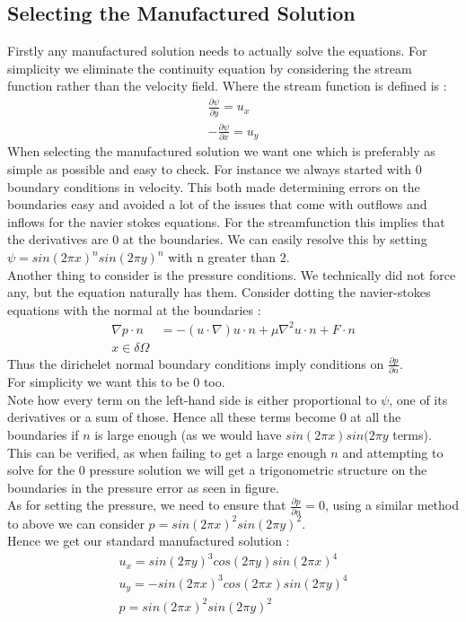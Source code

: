 \documentclass[11pt,twoside,a4paper]{article}
\begin{document}
\subsection{Selecting the Manufactured Solution}
Firstly any manufactured solution needs to actually solve the equations. For simplicity we eliminate the continuity equation by considering the stream function rather than the velocity field. Where the stream function is defined is :
\begin{align*}
\frac{ \partial \psi}{\partial y} = u_x \\
-\frac{\partial \psi}{\partial x} = u_y
\end{align*} 
When selecting the manufactured solution we want one which is preferably as simple as possible and easy to check. For instance we always started with $0$ boundary conditions in velocity. This both made determining errors on the boundaries easy and avoided a lot of the issues that come with outflows and inflows for the navier stokes equations. For the streamfunction this implies that the derivatives are 0 at the boundaries. We can easily resolve this by setting $\psi = sin(2 \pi x)^n sin(2 \pi y)^n$ with n greater than 2.\\
Another thing to consider is the pressure conditions. We technically did not force any, but the equation naturally has them. Consider dotting the navier-stokes equations with the normal at the boundaries :
\begin{align*}
\nabla p \cdot n &= -(u \cdot \nabla) u \cdot n  + \mu \nabla^2 u \cdot n + F \cdot n \\
x \in \delta \Omega
\end{align*}
Thus the dirichelet normal boundary conditions imply conditions on $\frac{\partial p}{\partial n}$.\\
For simplicity we want this to be $0$ too.\\
Note how every term on the left-hand side is either proportional to $\psi$, one of its derivatives or a sum of those. Hence all these terms become $0$ at all the boundaries if $n$ is large enough (as we would have $ sin(2 \pi x) sin(2 \pi y$ terms).\\
This can be verified, as when failing to get a large enough $n$ and attempting to solve for the $0$ pressure solution we will get a trigonometric structure on the boundaries in the pressure error as seen in figure.\\
As for setting the pressure, we need to ensure that $\frac{\partial p} {\partial n} = 0$, using a similar method to above we can consider $p =  sin(2 \pi x)^2 sin(2 \pi y)^2$.\\
Hence we get our standard manufactured solution :
\begin{align}
u_x = sin(2 \pi y)^3 cos(2 \pi y)sin(2 \pi x)^4 \\
u_y= -sin(2 \pi x)^3 cos(2 \pi x) sin(2 \pi y)^4 \\
p = sin(2 \pi x)^2 sin(2 \pi y)^2
\end{align}
\end{document}
